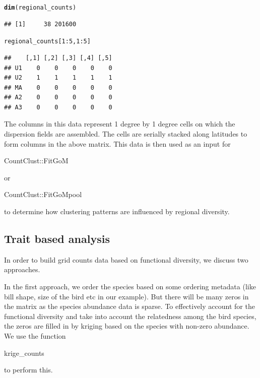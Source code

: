 \documentclass[12pt]{article}\usepackage[]{graphicx}\usepackage[usenames,dvipsnames]{color}
\makeatletter
\newcommand{\hlnum}[1]{\textcolor[rgb]{0.686,0.059,0.569}{#1}}%
\newcommand{\hlopt}[1]{\textcolor[rgb]{0,0,0}{#1}}%
\newcommand{\hlstd}[1]{\textcolor[rgb]{0.345,0.345,0.345}{#1}}%
\newcommand{\hlkwd}[1]{\textcolor[rgb]{0.737,0.353,0.396}{\textbf{#1}}}%
\newenvironment{kframe}{%
 \def\at@end@of@kframe{}%
 \ifinner\ifhmode%
  \def\at@end@of@kframe{\end{minipage}}%
  \begin{minipage}{\columnwidth}%
 \fi\fi%
 \def\FrameCommand##1{\hskip\@totalleftmargin \hskip-\fboxsep
 \colorbox{shadecolor}{##1}\hskip-\fboxsep
     \hskip-\linewidth \hskip-\@totalleftmargin \hskip\columnwidth}%
 \MakeFramed {\advance\hsize-\width
   \@totalleftmargin\z@ \linewidth\hsize
   \@setminipage}}%
 {\par\unskip\endMakeFramed%
 \at@end@of@kframe}
\newenvironment{knitrout}{}{} %
\makeatother
\begin{document}
\begin{knitrout}
\color{fgcolor}\begin{kframe}
\begin{alltt}
\hlkwd{dim}\hlstd{(regional_counts)}
\end{alltt}
\begin{verbatim}
## [1]     38 201600
\end{verbatim}
\begin{alltt}
\hlstd{regional_counts[}\hlnum{1}\hlopt{:}\hlnum{5}\hlstd{,}\hlnum{1}\hlopt{:}\hlnum{5}\hlstd{]}
\end{alltt}
\begin{verbatim}
##    [,1] [,2] [,3] [,4] [,5]
## U1    0    0    0    0    0
## U2    1    1    1    1    1
## MA    0    0    0    0    0
## A2    0    0    0    0    0
## A3    0    0    0    0    0
\end{verbatim}
\end{kframe}
\end{knitrout}

The columns in this data represent 1 degree by 1 degree cells on which the dispersion fields are assembled. The cells are serially stacked along latitudes to form columns in the above matrix. This data is then used as an input for \begin{verb} CountClust::FitGoM \end{verb} or \begin{verb} CountClust::FitGoMpool \end{verb}  to determine how clustering patterns are influenced by regional diversity.


\subsection{Trait based analysis}

In order to build grid counts data based on functional diversity, we discuss two approaches.

In the first approach, we order the species based on some ordering metadata (like bill shape, size of the bird etc in our example). But there will be many zeros in the matrix as the species abundance data is sparse. To effectively account for the functional diversity and take into account the relatedness among the bird species, the zeros are filled in by kriging based on the species with non-zero abundance. We use the function \begin{verb} krige_counts \end{verb} to perform this.
\end{document}
